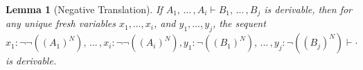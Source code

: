 \documentclass{elsarticle}
\newcommand{\FILLnt}[1]{\mathit{#1}}
\newcommand{\FILLmv}[1]{\mathit{#1}}
\newcommand{\FILLsym}[1]{#1}
\newtheorem{lemma}[theorem]{Lemma}
\begin{document}
\begin{lemma}[Negative Translation]
  \label{lemma:negative_translation}
  If $ \FILLnt{A_{{\mathrm{1}}}}  \FILLsym{,} \, ... \, \FILLsym{,}  \FILLnt{A_{\FILLmv{i}}}  \vdash  \FILLnt{B_{{\mathrm{1}}}}  \FILLsym{,} \, ... \, \FILLsym{,}  \FILLnt{B_{\FILLmv{j}}} $ is derivable, then for any
  unique fresh variables
  $\FILLmv{x_{{\mathrm{1}}}},\ldots,\FILLmv{x_{\FILLmv{i}}}$, and
  $\FILLmv{y_{{\mathrm{1}}}},\ldots,\FILLmv{y_{\FILLmv{j}}}$, the sequent
  $ \FILLmv{x_{{\mathrm{1}}}}  \FILLsym{:}   \lnot    \lnot  \FILLsym{(}   ( \FILLnt{A_{{\mathrm{1}}}} )^N   \FILLsym{)}     \FILLsym{,} \, ... \, \FILLsym{,}  \FILLmv{x_{\FILLmv{i}}}  \FILLsym{:}   \lnot    \lnot  \FILLsym{(}   ( \FILLnt{A_{\FILLmv{i}}} )^N   \FILLsym{)}     \FILLsym{,}  \FILLmv{y_{{\mathrm{1}}}}  \FILLsym{:}   \lnot  \FILLsym{(}   ( \FILLnt{B_{{\mathrm{1}}}} )^N   \FILLsym{)}   \FILLsym{,} \, ... \, \FILLsym{,}  \FILLmv{y_{\FILLmv{j}}}  \FILLsym{:}   \lnot  \FILLsym{(}   ( \FILLnt{B_{\FILLmv{j}}} )^N   \FILLsym{)}   \vdash   \cdot  $
  is derivable.
\end{lemma}
\end{document}
